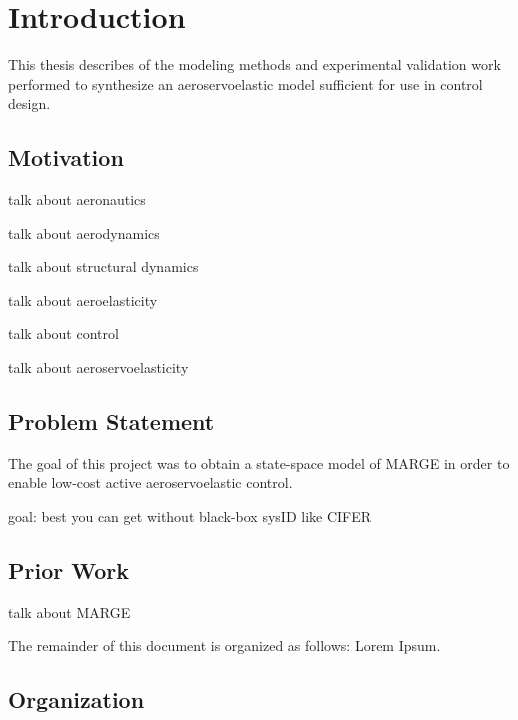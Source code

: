 \chapter{Introduction}
\label{ch:introduction}

This thesis describes of the modeling methods and experimental validation work performed to synthesize an aeroservoelastic model sufficient for use in control design.

\section{Motivation} %

talk about aeronautics

talk about aerodynamics

talk about structural dynamics

talk about aeroelasticity

talk about control

talk about aeroservoelasticity

\section{Problem Statement} %

The goal of this project was to obtain a state-space model of MARGE in order to enable low-cost active aeroservoelastic control.

goal: best you can get without black-box sysID like CIFER

\section{Prior Work} %

talk about MARGE

The remainder of this document is organized as follows: Lorem Ipsum.


\section{Organization} %


